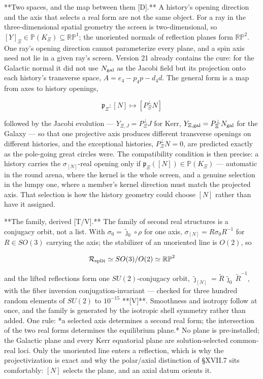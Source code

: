 **Two spaces, and the map between them [D].** A history's opening direction and the axis that selects a real form are not the same object. For a ray in the three-dimensional spatial geometry the screen is two-dimensional, so $[Y]_\Xi\in\mathbb P(K_\Xi)\subseteq\mathbb{RP}^1$; the unoriented normals of reflection planes form $\mathbb{RP}^2$. One ray's opening direction cannot parameterize every plane, and a spin axis need not lie in a given ray's screen. Version 21 already contains the cure: for the Galactic normal it did not use $N_{\rm gal}$ as the Jacobi field but its projection onto each history's transverse space, $A = e_4-p_4p-d_4d$. The general form is a map from axes to history openings,

$$\mathfrak p_\Xi:[N]\longmapsto[P^\perp_\Xi N]$$

followed by the Jacobi evolution — $Y_{\Xi,J} = P^\perp_\Xi J$ for Kerr, $Y_{\Xi,\rm gal} = P^\perp_\Xi N_{\rm gal}$ for the Galaxy — so that one projective axis produces different transverse openings on different histories, and the exceptional histories, $P^\perp_\Xi N = 0$, are predicted exactly as the pole-going great circles were. The compatibility condition is then precise: a history carries the $\sigma_{[N]}$-real opening only if $\mathfrak p_\Xi([N])\in\mathbb P(K_\Xi)$ — automatic in the round arena, where the kernel is the whole screen, and a genuine selection in the lumpy one, where a member's kernel direction must match the projected axis. That selection is how the history geometry could choose $[N]$ rather than have it assigned.

**The family, derived [T/V].** The family of second real structures is a conjugacy orbit, not a list. With $\sigma_0 = \widetilde\jmath_0\circ\rho$ for one axis, $\sigma_{[N]} = R\sigma_0R^{-1}$ for $R\in SO(3)$ carrying the axis; the stabilizer of an unoriented line is $O(2)$, so

$$\mathcal R_{\rm split}\simeq SO(3)/O(2)\simeq\mathbb{RP}^2$$

and the lifted reflections form one $SU(2)$-conjugacy orbit, $\widetilde\jmath_{[N]} = \widetilde R\,\widetilde\jmath_0\,\widetilde R^{-1}$, with the fiber inversion conjugation-invariant — checked for three hundred random elements of $SU(2)$ to $10^{-15}$ **[V]**. Smoothness and isotropy follow at once, and the family is generated by the isotropic shell symmetry rather than added. One rule: *a selected axis determines a second real form; the intersection of the two real forms determines the equilibrium plane.* No plane is pre-installed; the Galactic plane and every Kerr equatorial plane are solution-selected common-real loci. Only the unoriented line enters a reflection, which is why the projectivization is exact and why the polar/axial distinction of §XVII.7 sits comfortably: $[N]$ selects the plane, and an axial datum orients it.

